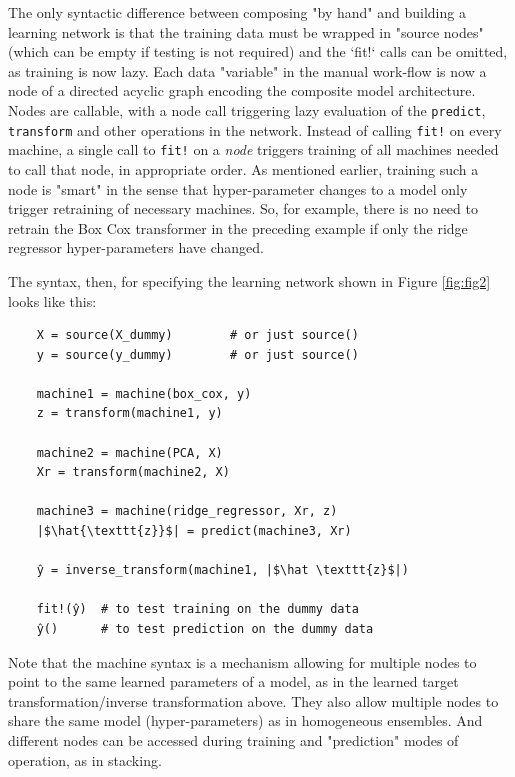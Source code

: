 \documentclass{article}
\begin{document}
The only syntactic difference between composing "by hand" and building
a learning network is that the training data must be wrapped in
"source nodes" (which can be empty if testing is not required) and the
`fit!` calls can be omitted, as training is now lazy. Each data
"variable" in the manual work-flow is now a node of a directed acyclic
graph encoding the composite model architecture. Nodes are callable,
with a node call triggering lazy evaluation of the \texttt{predict},
\texttt{transform} and other operations in the network. Instead of
calling \texttt{fit!} on every machine, a single call to \texttt{fit!}
on a \textit{node} triggers training of all machines needed to call
that node, in appropriate order. As mentioned earlier, training such a
node is "smart" in the sense that hyper-parameter changes to a model
only trigger retraining of necessary machines. So, for example, there
is no need to retrain the Box Cox transformer in the preceding example
if only the ridge regressor hyper-parameters have changed.

The syntax, then, for specifying the learning network shown in Figure
\ref{fig:fig2} looks like this:

{\small
\begin{verbatim}
    X = source(X_dummy)        # or just source()
    y = source(y_dummy)        # or just source()

    machine1 = machine(box_cox, y)
    z = transform(machine1, y)

    machine2 = machine(PCA, X)
    Xr = transform(machine2, X)

    machine3 = machine(ridge_regressor, Xr, z)
    |$\hat{\texttt{z}}$| = predict(machine3, Xr)

    ŷ = inverse_transform(machine1, |$\hat \texttt{z}$|)

    fit!(ŷ)  # to test training on the dummy data
    ŷ()      # to test prediction on the dummy data
\end{verbatim}
}

Note that the machine syntax is a mechanism allowing for multiple
nodes to point to the same learned parameters of a model, as in the
learned target transformation/inverse transformation above. They also
allow multiple nodes to share the same model (hyper-parameters) as in
homogeneous ensembles. And different nodes can be accessed during
training and "prediction" modes of operation, as in stacking.
\end{document}
